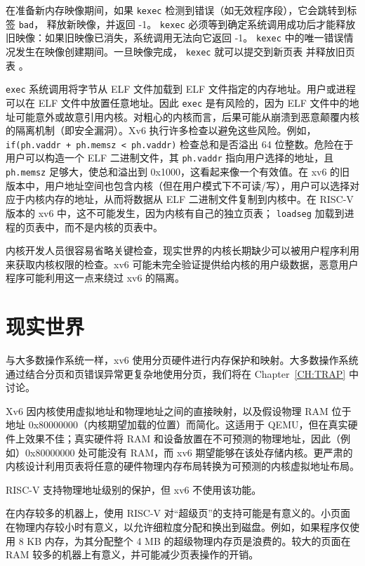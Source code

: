 在准备新内存映像期间，如果
\lstinline{kexec}
检测到错误（如无效程序段），它会跳转到标签
\lstinline{bad}，
释放新映像，并返回 -1。
\lstinline{kexec}
必须等到确定系统调用成功后才能释放旧映像：如果旧映像已消失，系统调用无法向它返回 -1。
\lstinline{kexec}
中的唯一错误情况发生在映像创建期间。一旦映像完成，
\lstinline{kexec}
就可以提交到新页表
并释放旧页表
。

\lstinline{exec} 系统调用将字节从 ELF 文件加载到 ELF 文件指定的内存地址。用户或进程可以在 ELF 文件中放置任意地址。因此 \lstinline{exec} 是有风险的，因为 ELF 文件中的地址可能意外或故意引用内核。对粗心的内核而言，后果可能从崩溃到恶意颠覆内核的隔离机制（即安全漏洞）。Xv6 执行许多检查以避免这些风险。例如，\lstinline{if(ph.vaddr + ph.memsz < ph.vaddr)} 检查总和是否溢出 64 位整数。危险在于用户可以构造一个 ELF 二进制文件，其 \lstinline{ph.vaddr} 指向用户选择的地址，且 \lstinline{ph.memsz} 足够大，使总和溢出到 0x1000，这看起来像一个有效值。在 xv6 的旧版本中，用户地址空间也包含内核（但在用户模式下不可读/写），用户可以选择对应于内核内存的地址，从而将数据从 ELF 二进制文件复制到内核中。在 RISC-V 版本的 xv6 中，这不可能发生，因为内核有自己的独立页表；
\lstinline{loadseg}
加载到进程的页表中，而不是内核的页表中。

内核开发人员很容易省略关键检查，现实世界的内核长期缺少可以被用户程序利用来获取内核权限的检查。xv6 可能未完全验证提供给内核的用户级数据，恶意用户程序可能利用这一点来绕过 xv6 的隔离。
\section{现实世界}

与大多数操作系统一样，xv6 使用分页硬件进行内存保护和映射。大多数操作系统通过结合分页和页错误异常更复杂地使用分页，我们将在 Chapter~\ref{CH:TRAP} 中讨论。

Xv6 因内核使用虚拟地址和物理地址之间的直接映射，以及假设物理 RAM 位于地址 0x80000000（内核期望加载的位置）而简化。这适用于 QEMU，但在真实硬件上效果不佳；真实硬件将 RAM 和设备放置在不可预测的物理地址，因此（例如）0x80000000 处可能没有 RAM，而 xv6 期望能够在该处存储内核。更严肃的内核设计利用页表将任意的硬件物理内存布局转换为可预测的内核虚拟地址布局。

RISC-V 支持物理地址级别的保护，但 xv6 不使用该功能。

在内存较多的机器上，使用 RISC-V 对``超级页''的支持可能是有意义的。小页面在物理内存较小时有意义，以允许细粒度分配和换出到磁盘。例如，如果程序仅使用 8 KB 内存，为其分配整个 4 MB 的超级物理内存页是浪费的。较大的页面在 RAM 较多的机器上有意义，并可能减少页表操作的开销。

